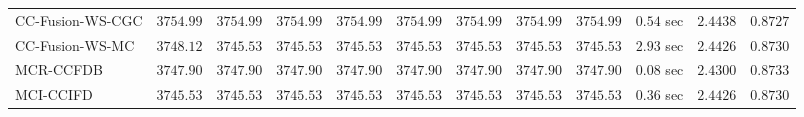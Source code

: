 \begin{table}[H]
\begin{tabular}{lrrrrrrrrrrr}
    CC-Fusion-WS-CGC & $      3754.99$ & $      3754.99$ & $      3754.99$ & $      3754.99$ & $      3754.99$ & $      3754.99$ & $      3754.99$ & $      3754.99$ & $         0.54$ sec    & $       2.4438$  & $       0.8727$ \\ 
     CC-Fusion-WS-MC & $      3748.12$ & $      3745.53$ & $      3745.53$ & $      3745.53$ & $      3745.53$ & $      3745.53$ & $      3745.53$ & $      3745.53$ & $         2.93$ sec    & $       2.4426$  & $       0.8730$ \\ 
\cmidrule{1-1} 
           MCR-CCFDB & $      3747.90$ & $      3747.90$ & $      3747.90$ & $      3747.90$ & $      3747.90$ & $      3747.90$ & $      3747.90$ & $      3747.90$ & $         0.08$ sec    & $       2.4300$  & $       0.8733$ \\ 
\cmidrule{1-1} 
           MCI-CCIFD & $      3745.53$ & $      3745.53$ & $      3745.53$ & $      3745.53$ & $      3745.53$ & $      3745.53$ & $      3745.53$ & $      3745.53$ & $         0.36$ sec    & $       2.4426$  & $       0.8730$ \\ 
\bottomrule
\end{tabular}
\end{table}

